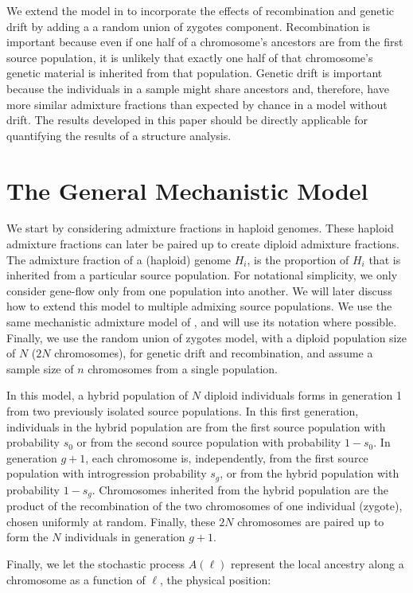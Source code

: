 \documentclass[11pt]{amsart}
\begin{document}
We extend the model in \citet{verdu2011general} to incorporate the effects of recombination and genetic drift by adding a a random union of zygotes component. Recombination is important because even if one half of a chromosome's ancestors are from the first source population, it is unlikely that exactly one half of that chromosome's genetic material is inherited from that population. Genetic drift is important because the individuals in a sample might share ancestors and, therefore, have more similar admixture fractions than expected by chance in a model without drift. The results developed in this paper should be directly applicable for quantifying the results of a structure analysis.

\section*{The General Mechanistic Model}
We start by considering admixture fractions in haploid genomes. These haploid admixture fractions can later be paired up to create diploid admixture fractions. The admixture fraction of a (haploid) genome $H_i$, is the proportion of $H_i$ that is inherited from a particular source population. For notational simplicity, we only consider gene-flow only from one population into another. We will later discuss how to extend this model to multiple admixing source populations. We use the same mechanistic admixture model of \citet{verdu2011general}, and will use its notation where possible. Finally, we use the random union of zygotes model, with a diploid population size of $N$ ($2N$ chromosomes), for genetic drift and recombination, and assume a sample size of $n$ chromosomes from a single population.

In this model, a hybrid population of $N$ diploid individuals forms in generation 1 from two previously isolated source populations. In this first generation, individuals in the hybrid population are from the first source population with probability $s_0$ or from the second source population with probability $1-s_0$. In generation $g+1$, each chromosome is, independently, from the first source population with introgression probability $s_g$, or from the hybrid population with probability $1-s_g$. Chromosomes inherited from the hybrid population are the product of the recombination of the two chromosomes of one individual (zygote), chosen uniformly at random. Finally, these $2N$ chromosomes are paired up to form the $N$ individuals in generation $g+1$.

Finally, we let the stochastic process $A(\ell)$ represent the local ancestry along a chromosome as a function of $\ell$, the physical position:
\end{document}
